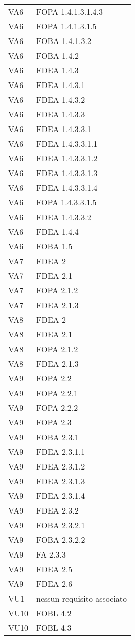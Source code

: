 \begin{longtable}{XX}
VA6&FOPA 1.4.1.3.1.4.3\\ 
VA6&FOPA 1.4.1.3.1.5\\ 
VA6&FOBA 1.4.1.3.2\\ 
VA6&FOBA 1.4.2\\ 
VA6&FDEA 1.4.3\\ 
VA6&FDEA 1.4.3.1\\ 
VA6&FDEA 1.4.3.2\\ 
VA6&FDEA 1.4.3.3\\ 
VA6&FDEA 1.4.3.3.1\\ 
VA6&FDEA 1.4.3.3.1.1\\ 
VA6&FDEA 1.4.3.3.1.2\\ 
VA6&FDEA 1.4.3.3.1.3\\ 
VA6&FDEA 1.4.3.3.1.4\\ 
VA6&FOPA 1.4.3.3.1.5\\ 
VA6&FDEA 1.4.3.3.2\\ 
VA6&FDEA 1.4.4\\ 
VA6&FOBA 1.5\\ 
\midrule 
VA7&FDEA 2\\ 
VA7&FDEA 2.1\\ 
VA7&FOPA 2.1.2\\ 
VA7&FDEA 2.1.3\\ 
\midrule 
VA8&FDEA 2\\ 
VA8&FDEA 2.1\\ 
VA8&FOPA 2.1.2\\ 
VA8&FDEA 2.1.3\\ 
\midrule 
VA9&FOPA 2.2\\ 
VA9&FOPA 2.2.1\\ 
VA9&FOPA 2.2.2\\ 
VA9&FOPA 2.3\\ 
VA9&FOBA 2.3.1\\ 
VA9&FDEA 2.3.1.1\\ 
VA9&FDEA 2.3.1.2\\ 
VA9&FDEA 2.3.1.3\\ 
VA9&FDEA 2.3.1.4\\ 
VA9&FDEA 2.3.2\\ 
VA9&FOBA 2.3.2.1\\ 
VA9&FOBA 2.3.2.2\\ 
VA9&FA 2.3.3\\ 
VA9&FDEA 2.5\\ 
VA9&FDEA 2.6\\ 
\midrule 
VU1&nessun requisito associato\\ 
\midrule 
VU10&FOBL 4.2\\ 
VU10&FOBL 4.3\\ 

\end{longtable}
